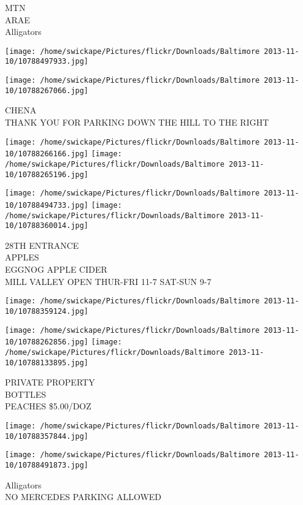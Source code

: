 \documentclass[10pt,letterpaper]{article}
\begin{document}
MTN\\
ARAE\\
Alligators
\pagebreak

\texttt{[image: /home/swickape/Pictures/flickr/Downloads/Baltimore 2013-11-10/10788497933.jpg]}

\vspace{0.25in}
\texttt{[image: /home/swickape/Pictures/flickr/Downloads/Baltimore 2013-11-10/10788267066.jpg]}

CHENA\\
THANK YOU FOR PARKING DOWN THE HILL TO THE RIGHT
\pagebreak

\texttt{[image: /home/swickape/Pictures/flickr/Downloads/Baltimore 2013-11-10/10788266166.jpg]}
\texttt{[image: /home/swickape/Pictures/flickr/Downloads/Baltimore 2013-11-10/10788265196.jpg]}

\texttt{[image: /home/swickape/Pictures/flickr/Downloads/Baltimore 2013-11-10/10788494733.jpg]}
\texttt{[image: /home/swickape/Pictures/flickr/Downloads/Baltimore 2013-11-10/10788360014.jpg]}

28TH ENTRANCE\\
APPLES\\
EGGNOG APPLE CIDER\\
MILL VALLEY OPEN THUR{-}FRI 11{-}7 SAT{-}SUN 9{-}7
\pagebreak

\texttt{[image: /home/swickape/Pictures/flickr/Downloads/Baltimore 2013-11-10/10788359124.jpg]}

\vspace{0.25in}
\texttt{[image: /home/swickape/Pictures/flickr/Downloads/Baltimore 2013-11-10/10788262856.jpg]}
\texttt{[image: /home/swickape/Pictures/flickr/Downloads/Baltimore 2013-11-10/10788133895.jpg]}

PRIVATE PROPERTY\\
BOTTLES\\
PEACHES \$5.00/DOZ
\pagebreak

\texttt{[image: /home/swickape/Pictures/flickr/Downloads/Baltimore 2013-11-10/10788357844.jpg]}

\vspace{0.25in}
\texttt{[image: /home/swickape/Pictures/flickr/Downloads/Baltimore 2013-11-10/10788491873.jpg]}

Alligators\\
NO MERCEDES PARKING ALLOWED
\pagebreak
\end{document}
